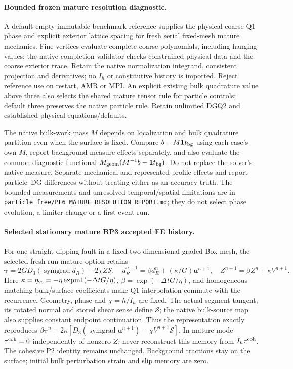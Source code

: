 \documentclass[11pt]{article}
\begin{document}
\paragraph{Bounded frozen mature resolution diagnostic.}
A default-empty immutable benchmark reference supplies the physical coarse Q1
phase and explicit exterior lattice spacing for fresh serial fixed-mesh mature
mechanics. Fine vertices evaluate complete coarse polynomials, including hanging
values; the native completion validator checks constrained physical data and the
coarse exterior trace. Retain the native normalization integrand, consistent
projection and derivatives; no $I_h$ or constitutive history is imported.
Reject reference use on restart, AMR or MPI. An explicit existing bulk quadrature
value above three also selects the shared mature tensor rule for particle
controls; default three preserves the native particle rule. Retain unlimited
DGQ2 and established physical equations/defaults.

The native bulk-work mass $M$ depends on localization and bulk quadrature
partition even when the surface is fixed. Compare $b-M\boldsymbol 1t_{\rm bg}$
using each case's own $M$, report background-measure effects separately, and
also evaluate the common diagnostic functional
$M_{\rm geom}(M^{-1}b-\boldsymbol 1t_{\rm bg})$. Do not replace the solver's
native measure. Separate mechanical and represented-profile effects and report
particle--DG differences without treating either as an accuracy truth. The
bounded measurements and unresolved temporal/spatial limitations are in
\texttt{particle\_free/PF6\_MATURE\_RESOLUTION\_REPORT.md}; they do not select
phase evolution, a limiter change or a first-event run.

\paragraph{Selected stationary mature BP3 accepted FE history.}
For one straight dipping fault in a fixed two-dimensional graded Box mesh,
the selected fresh-run mature option retains
\[
 \boldsymbol\tau=2G D_3(\operatorname{symgrad}d_R)-2\chi Z\mathcal S,
 \quad d_R^{n+1}=\beta d_R^n+(\kappa/G)\boldsymbol u^{n+1},
 \quad Z^{n+1}=\beta Z^n+\kappa V^{n+1}.
\]
Here $\kappa=\eta_{\rm ve}=-\eta\operatorname{expm1}(-\Delta t G/\eta)$,
$\beta=\exp(-\Delta t G/\eta)$, and homogeneous matching bulk/surface
coefficients make Q1 interpolation commute with the recurrence. Geometry,
phase and $\chi=h/I_h$ are fixed. The actual segment tangent, its rotated
normal and stored shear sense define $\mathcal S$; the native bulk-source map
also supplies constant endpoint continuation. Thus the representation exactly
reproduces $\beta\boldsymbol\tau^n+2\kappa[D_3(\operatorname{symgrad}\boldsymbol u^{n+1})
-\chi V^{n+1}\mathcal S]$. In mature mode $\tau^{\rm coh}=0$ independently
of nonzero $Z$; never reconstruct this memory from $I_h\tau^{\rm coh}$.
The cohesive P2 identity remains unchanged. Background tractions stay on the
surface; initial bulk perturbation strain and slip memory are zero.
\end{document}
